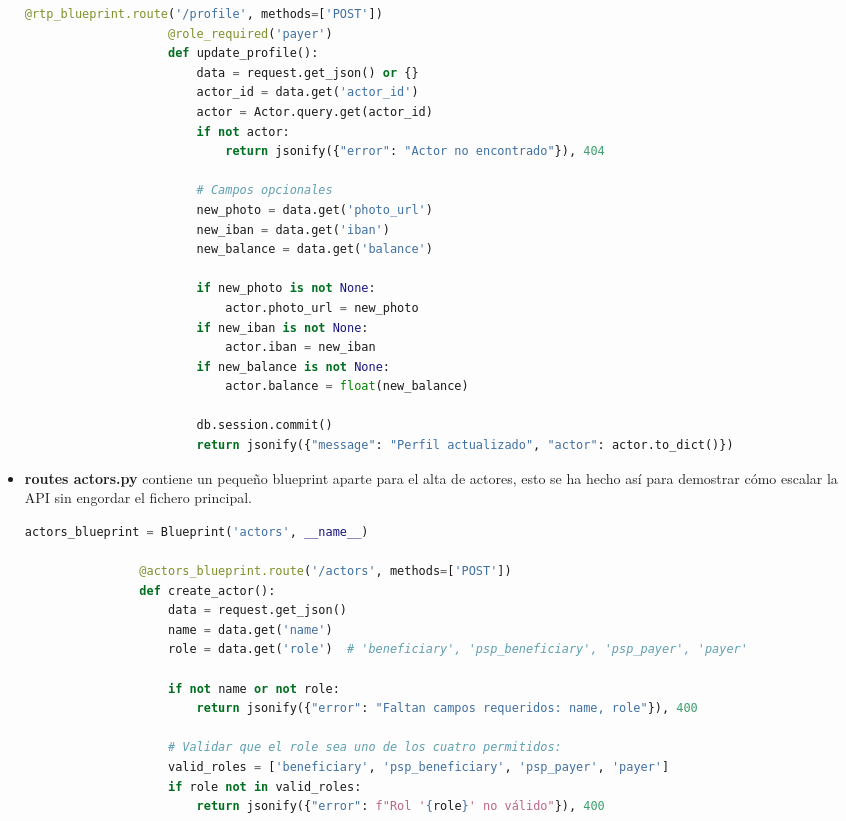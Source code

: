 \begin{itemize}
            \begin{lstlisting}[language=Python, style=custom]
                    @rtp_blueprint.route('/profile', methods=['POST'])
                    @role_required('payer')
                    def update_profile():
                        data = request.get_json() or {}
                        actor_id = data.get('actor_id')
                        actor = Actor.query.get(actor_id)
                        if not actor:
                            return jsonify({"error": "Actor no encontrado"}), 404

                        # Campos opcionales
                        new_photo = data.get('photo_url')
                        new_iban = data.get('iban')
                        new_balance = data.get('balance')

                        if new_photo is not None:
                            actor.photo_url = new_photo
                        if new_iban is not None:
                            actor.iban = new_iban
                        if new_balance is not None:
                            actor.balance = float(new_balance)

                        db.session.commit()
                        return jsonify({"message": "Perfil actualizado", "actor": actor.to_dict()})

            \end{lstlisting}

    \item \textbf{routes actors.py} contiene un pequeño blueprint aparte para el alta de actores, esto se ha hecho así para demostrar cómo escalar la API sin engordar el fichero principal.
            \begin{lstlisting}[language=Python, style=custom]
                actors_blueprint = Blueprint('actors', __name__)

                @actors_blueprint.route('/actors', methods=['POST'])
                def create_actor():
                    data = request.get_json()
                    name = data.get('name')
                    role = data.get('role')  # 'beneficiary', 'psp_beneficiary', 'psp_payer', 'payer'

                    if not name or not role:
                        return jsonify({"error": "Faltan campos requeridos: name, role"}), 400

                    # Validar que el role sea uno de los cuatro permitidos:
                    valid_roles = ['beneficiary', 'psp_beneficiary', 'psp_payer', 'payer']
                    if role not in valid_roles:
                        return jsonify({"error": f"Rol '{role}' no válido"}), 400


\end{lstlisting}
\end{itemize}
